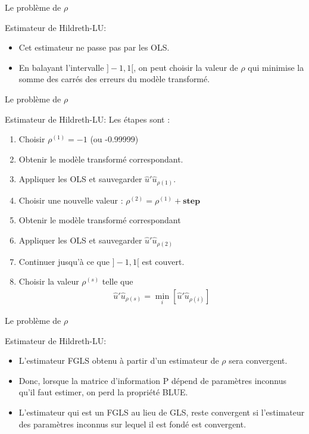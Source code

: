 \documentclass{beamer}
\begin{document}
\begin{frame}{Le problème de $\rho$}
\begin{block}{Estimateur de Hildreth-LU:}
\begin{itemize}
\item Cet estimateur ne passe pas par les OLS.
\item En balayant l’intervalle $]−1, 1 [$, on peut choisir la valeur de $\rho$ qui minimise la somme des carrés des erreurs du modèle transformé. 

\end{itemize}
\end{block}
\end{frame}

\begin{frame}{Le problème de $\rho$}
\begin{block}{Estimateur de Hildreth-LU:}
Les étapes sont :
\begin{enumerate}
\item Choisir $\rho^{(1)} = −1$ (ou -0.99999)
\item Obtenir le modèle transformé correspondant.
\item Appliquer les OLS et sauvegarder $\hat{u}'\hat{u}_{\rho(1)}$.
\item  Choisir une nouvelle valeur : $\rho^{(2)} = \rho^{(1)} + \textbf{step}$
\item Obtenir le modèle transformé correspondant
\item Appliquer les OLS et sauvegarder $\hat{u}'\hat{u}_{\rho (2)}$
\item Continuer jusqu’à ce que $]−1, 1 [$ est couvert.
\item Choisir la valeur $\rho^{(s)}$ telle que
\begin{align*}
\hat{u}'\hat{u}_{\rho (s)}=\min_i [\hat{u}'\hat{u}_{\rho (i)}]
\end{align*}
\end{enumerate}
\end{block}
\end{frame}


\begin{frame}{Le problème de $\rho$}
\begin{block}{Estimateur de Hildreth-LU:}
\begin{itemize}
\item L’estimateur FGLS obtenu à partir d’un estimateur de $\rho$ sera convergent. 
\item Donc, lorsque la matrice d’information P dépend de paramètres inconnus qu’il faut estimer, on perd la propriété BLUE.
\item L’estimateur qui est un FGLS au lieu de GLS, reste convergent si l’estimateur des paramètres inconnus sur lequel il est fondé est convergent.
\end{itemize}
\end{block}
\end{frame}
\end{document}
